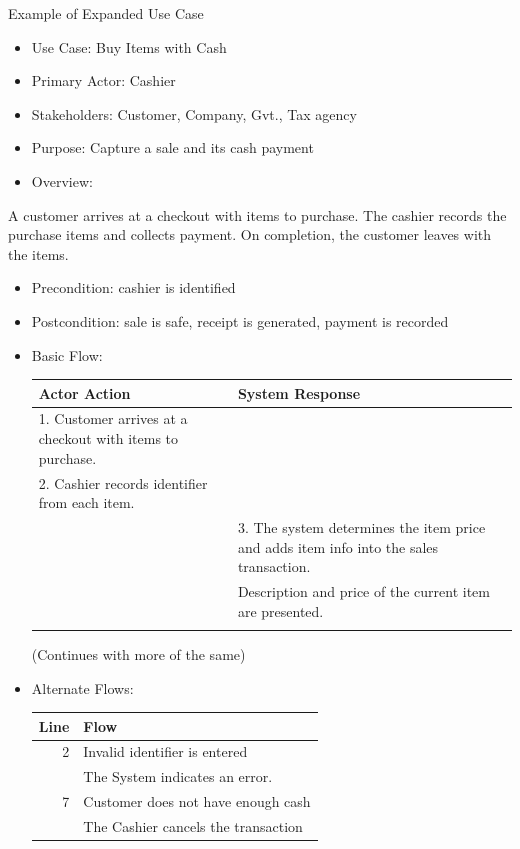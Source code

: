 \documentclass[10pt,t,a4paper]{beamer}
\begin{document}
\begin{frame}[shrink=20,label=sec-1-9]{Example of Expanded Use Case}
\begin{itemize}
\item Use Case:        Buy Items with Cash
\item Primary Actor:        Cashier
\item Stakeholders:        Customer, Company, Gvt., Tax agency
\item Purpose:                Capture a sale and its cash payment
\item Overview:
\end{itemize}
A customer arrives at a checkout with items to purchase.
The cashier records the purchase items and collects payment.
On completion, the customer leaves with the items.
\begin{itemize}
\item Precondition:        cashier is identified
\item Postcondition:        sale is safe, receipt is generated, payment is recorded
\item Basic Flow:
\begin{center}
\begin{tabular}{ll}
Actor Action & System Response\\
\hline
1. Customer arrives at a checkout with items to purchase. & \\
2. Cashier records identifier from each item. & \\
 & 3. The system determines the item price and adds item info into the sales transaction.\\
 & Description and price of the current item are presented.\\
 & \\
\end{tabular}
\end{center}
(Continues with more of the same)
\item Alternate Flows:
\begin{center}
\begin{tabular}{rl}
Line & Flow\\
\hline
2 & Invalid identifier is entered\\
 & The System indicates an error.\\
7 & Customer does not have enough cash\\
 & The Cashier cancels the transaction\\
\end{tabular}
\end{center}

\end{itemize}
\end{frame}
\end{document}
